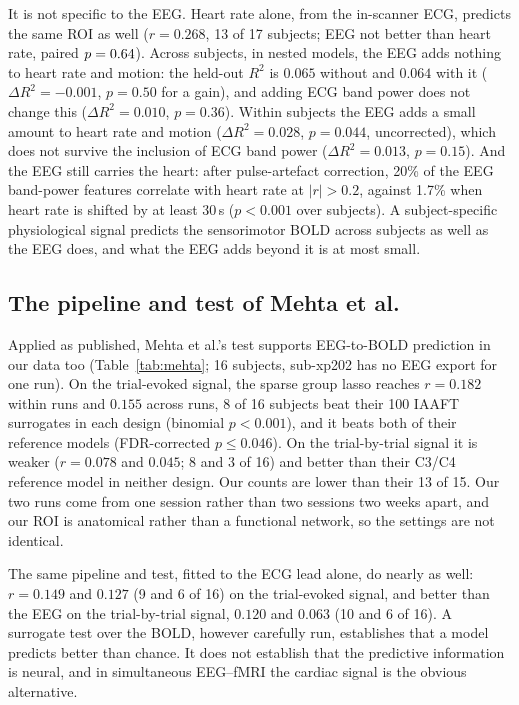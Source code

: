 It is not specific to the EEG. Heart rate alone, from the in-scanner ECG, predicts the same ROI as well ($r=0.268$, 13 of 17 subjects; EEG not better than heart rate, paired $p=0.64$). Across subjects, in nested models, the EEG adds nothing to heart rate and motion: the held-out $R^2$ is $0.065$ without and $0.064$ with it ($\Delta R^2=-0.001$, $p=0.50$ for a gain), and adding ECG band power does not change this ($\Delta R^2=0.010$, $p=0.36$). Within subjects the EEG adds a small amount to heart rate and motion ($\Delta R^2=0.028$, $p=0.044$, uncorrected), which does not survive the inclusion of ECG band power ($\Delta R^2=0.013$, $p=0.15$). And the EEG still carries the heart: after pulse-artefact correction, 20\% of the EEG band-power features correlate with heart rate at $|r|>0.2$, against 1.7\% when heart rate is shifted by at least 30\,s ($p<0.001$ over subjects). A subject-specific physiological signal predicts the sensorimotor BOLD across subjects as well as the EEG does, and what the EEG adds beyond it is at most small.

\subsection{The pipeline and test of Mehta et al.}\label{sec:res:mehta}
Applied as published, Mehta et al.'s test supports EEG-to-BOLD prediction in our data too (Table~\ref{tab:mehta}; 16 subjects, sub-xp202 has no EEG export for one run). On the trial-evoked signal, the sparse group lasso reaches $r=0.182$ within runs and $0.155$ across runs, 8 of 16 subjects beat their 100 IAAFT surrogates in each design (binomial $p<0.001$), and it beats both of their reference models (FDR-corrected $p\le0.046$). On the trial-by-trial signal it is weaker ($r=0.078$ and $0.045$; 8 and 3 of 16) and better than their C3/C4 reference model in neither design. Our counts are lower than their 13 of 15. Our two runs come from one session rather than two sessions two weeks apart, and our ROI is anatomical rather than a functional network, so the settings are not identical.

The same pipeline and test, fitted to the ECG lead alone, do nearly as well: $r=0.149$ and $0.127$ (9 and 6 of 16) on the trial-evoked signal, and better than the EEG on the trial-by-trial signal, $0.120$ and $0.063$ (10 and 6 of 16). A surrogate test over the BOLD, however carefully run, establishes that a model predicts better than chance. It does not establish that the predictive information is neural, and in simultaneous EEG--fMRI the cardiac signal is the obvious alternative.

